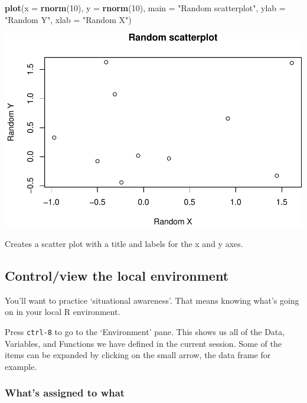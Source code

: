 \documentclass[]{article}
\newenvironment{Shaded}{\begin{snugshade}}{\end{snugshade}}
\newcommand{\KeywordTok}[1]{\textcolor[rgb]{0.13,0.29,0.53}{\textbf{#1}}}
\newcommand{\DataTypeTok}[1]{\textcolor[rgb]{0.13,0.29,0.53}{#1}}
\newcommand{\DecValTok}[1]{\textcolor[rgb]{0.00,0.00,0.81}{#1}}
\newcommand{\StringTok}[1]{\textcolor[rgb]{0.31,0.60,0.02}{#1}}
\newcommand{\NormalTok}[1]{#1}
\begin{document}
\begin{Shaded}
\begin{Highlighting}[]
\KeywordTok{plot}\NormalTok{(}\DataTypeTok{x =} \KeywordTok{rnorm}\NormalTok{(}\DecValTok{10}\NormalTok{), }\DataTypeTok{y =} \KeywordTok{rnorm}\NormalTok{(}\DecValTok{10}\NormalTok{), }\DataTypeTok{main =} \StringTok{"Random scatterplot"}\NormalTok{, }\DataTypeTok{ylab =} \StringTok{"Random Y"}\NormalTok{, }
    \DataTypeTok{xlab =} \StringTok{"Random X"}\NormalTok{)}
\end{Highlighting}
\end{Shaded}

\includegraphics{slow-r_files/figure-latex/unnamed-chunk-55-1.pdf}

Creates a scatter plot with a title and labels for the x and y axes.

\subsection{Control/view the local
environment}\label{controlview-the-local-environment}

You'll want to practice `situational awareness'. That means knowing
what's going on in your local R environment.

Press \texttt{ctrl-8} to go to the `Environment' pane. This shows us all
of the Data, Variables, and Functions we have defined in the current
session. Some of the items can be expanded by clicking on the small
arrow, the data frame for example.

\subsubsection{What's assigned to what}\label{whats-assigned-to-what}
\end{document}
